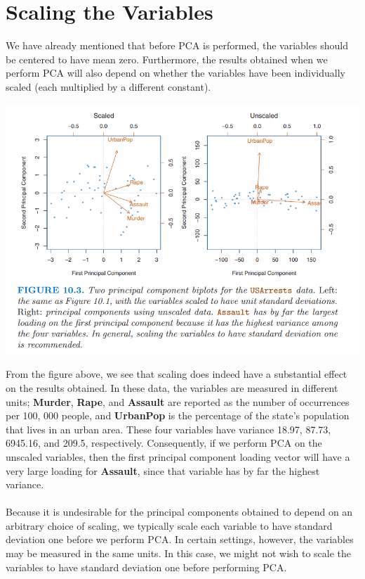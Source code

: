 \section{Scaling the Variables}
We have already mentioned that before PCA is performed, the variables should be centered to have mean zero. Furthermore, the results obtained when we perform PCA will also depend on whether the variables have been individually scaled (each multiplied by a different constant).
\begin{center}
    \includegraphics[scale=0.8]{images/scaled pca.png}
\end{center}
From the figure above, we see that scaling does indeed have a substantial effect on the results obtained. In these data, the variables are measured in different units; \textbf{Murder}, \textbf{Rape}, and \textbf{Assault} are reported as the number of occurrences per 100, 000 people, and \textbf{UrbanPop} is the percentage of the state’s population that lives in an urban area. These four variables have variance 18.97, 87.73, 6945.16, and 209.5, respectively. Consequently, if we perform PCA on the unscaled variables, then the first principal component loading vector will have a very large loading for \textbf{Assault}, since that variable has by far the highest variance.
\\\\
Because it is undesirable for the principal components obtained to depend on an arbitrary choice of scaling, we typically scale each variable to have standard deviation one before we perform PCA. In certain settings, however, the variables may be measured in the same units. In this case, we might not wish to scale the variables to have standard deviation one before performing PCA.

